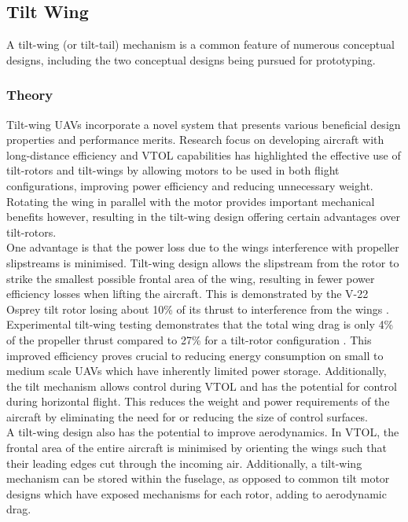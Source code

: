 \subsection{Tilt Wing}
A tilt-wing (or tilt-tail) mechanism is a common feature of numerous conceptual designs, including the two conceptual designs being pursued for prototyping.  

\subsubsection{Theory}
Tilt-wing UAVs incorporate a novel system that presents various beneficial design properties and performance merits. Research focus on developing aircraft with long-distance efficiency and VTOL capabilities has highlighted the effective use of tilt-rotors and tilt-wings by allowing motors to be used in both flight configurations, improving power efficiency and reducing unnecessary weight. Rotating the wing in parallel with the motor provides important mechanical benefits however, resulting in the tilt-wing design offering certain advantages over tilt-rotors. \\

One advantage is that the power loss due to the wings interference with propeller slipstreams is minimised. Tilt-wing design allows the slipstream from the rotor to strike the smallest possible frontal area of the wing, resulting in fewer power efficiency losses when lifting the aircraft. This is demonstrated by the V-22 Osprey tilt rotor losing about 10\% of its thrust to interference from the wings . Experimental tilt-wing testing demonstrates that the total wing drag is only 4\% of the propeller thrust compared to 27\% for a tilt-rotor configuration . This improved efficiency proves crucial to reducing energy consumption on small to medium scale UAVs which have inherently limited power storage. Additionally, the tilt mechanism allows control during VTOL and has the potential for control during horizontal flight. This reduces the weight and power requirements of the aircraft by eliminating the need for or reducing the size of control surfaces.\\

A tilt-wing design also has the potential to improve aerodynamics. In VTOL, the frontal area of the entire aircraft is minimised by orienting the wings such that their leading edges cut through the incoming air. Additionally, a tilt-wing mechanism can be stored within the fuselage, as opposed to common tilt motor designs which have exposed mechanisms for each rotor, adding to aerodynamic drag. \\

